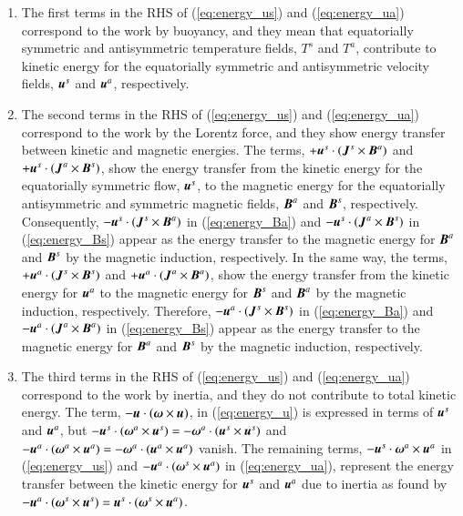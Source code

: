 \begin{enumerate}
\item 
The first terms in the RHS of (\ref{eq:energy_us}) and (\ref{eq:energy_ua}) correspond to the work by buoyancy, and they mean that equatorially symmetric and antisymmetric temperature fields, $T^s$ and $T^a$, contribute to kinetic energy for the equatorially symmetric and antisymmetric velocity fields, $\mbox{\boldmath$u$}^s$ and $\mbox{\boldmath$u$}^a$, respectively.

\item 
The second terms in the RHS of (\ref{eq:energy_us}) and (\ref{eq:energy_ua}) correspond to the work by the Lorentz force, and they show energy transfer between kinetic and magnetic energies.
The terms, $+\mbox{\boldmath$u$}^s \cdot (\mbox{\boldmath$J$}^s \times \mbox{\boldmath$B$}^a)$ and $+\mbox{\boldmath$u$}^s \cdot (\mbox{\boldmath$J$}^a \times \mbox{\boldmath$B$}^s)$, show the energy transfer from the kinetic energy for the equatorially symmetric flow, $\mbox{\boldmath$u$}^s$, to the magnetic energy for the equatorially antisymmetric and symmetric magnetic fields, $\mbox{\boldmath$B$}^a$  and $\mbox{\boldmath$B$}^s$, respectively. 
Consequently, $-\mbox{\boldmath$u$}^s \cdot (\mbox{\boldmath$J$}^s \times \mbox{\boldmath$B$}^a)$ in (\ref{eq:energy_Ba}) and $-\mbox{\boldmath$u$}^s \cdot (\mbox{\boldmath$J$}^a \times \mbox{\boldmath$B$}^s)$ in (\ref{eq:energy_Bs}) appear as the energy transfer to the magnetic energy for $\mbox{\boldmath$B$}^a$ and $\mbox{\boldmath$B$}^s$ by the magnetic induction, respectively.
In the same way, the terms, $+\mbox{\boldmath$u$}^a \cdot (\mbox{\boldmath$J$}^s \times \mbox{\boldmath$B$}^s)$ and $+\mbox{\boldmath$u$}^a \cdot (\mbox{\boldmath$J$}^a \times \mbox{\boldmath$B$}^a)$, show the energy transfer from the kinetic energy for $\mbox{\boldmath$u$}^a$ to the magnetic energy for $\mbox{\boldmath$B$}^s$ and $\mbox{\boldmath$B$}^a$ by the magnetic induction, respectively.
Therefore, $-\mbox{\boldmath$u$}^a \cdot (\mbox{\boldmath$J$}^s \times \mbox{\boldmath$B$}^s)$ in (\ref{eq:energy_Ba}) and $-\mbox{\boldmath$u$}^a \cdot (\mbox{\boldmath$J$}^a \times \mbox{\boldmath$B$}^a)$ in (\ref{eq:energy_Bs}) appear as the energy transfer to the magnetic energy for $\mbox{\boldmath$B$}^a$ and $\mbox{\boldmath$B$}^s$ by the magnetic induction, respectively.

\item 
The third terms in the RHS of (\ref{eq:energy_us}) and (\ref{eq:energy_ua}) correspond to the work by inertia, and they do not contribute to total kinetic energy.
The term, $-\mbox{\boldmath$u$} \cdot (\mbox{\boldmath$\omega$} \times \mbox{\boldmath$u$})$, in (\ref{eq:energy_u}) is expressed in terms of $\mbox{\boldmath$u$}^s$ and $\mbox{\boldmath$u$}^a$, but $-\mbox{\boldmath$u$}^s \cdot (\mbox{\boldmath$\omega$}^a \times \mbox{\boldmath$u$}^s) = -\mbox{\boldmath$\omega$}^a \cdot (\mbox{\boldmath$u$}^s \times \mbox{\boldmath$u$}^s)$ and $-\mbox{\boldmath$u$}^a \cdot (\mbox{\boldmath$\omega$}^a \times \mbox{\boldmath$u$}^a) = -\mbox{\boldmath$\omega$}^a \cdot (\mbox{\boldmath$u$}^a \times \mbox{\boldmath$u$}^a)$ vanish. 
The remaining terms, $-\mbox{\boldmath$u$}^s \cdot \mbox{\boldmath$\omega$}^a \times \mbox{\boldmath$u$}^a$ in (\ref{eq:energy_us}) and $-\mbox{\boldmath$u$}^a \cdot (\mbox{\boldmath$\omega$}^s \times \mbox{\boldmath$u$}^a)$ in (\ref{eq:energy_ua}), represent the energy transfer between the kinetic energy for $\mbox{\boldmath$u$}^s$ and $\mbox{\boldmath$u$}^a$ due to inertia as found by $-\mbox{\boldmath$u$}^a \cdot (\mbox{\boldmath$\omega$}^s \times \mbox{\boldmath$u$}^s) = \mbox{\boldmath$u$}^s \cdot (\mbox{\boldmath$\omega$}^s \times \mbox{\boldmath$u$}^a)$.


\end{enumerate}
